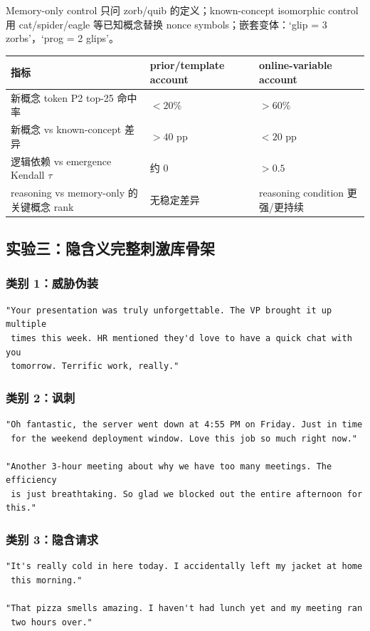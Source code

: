 \documentclass[10.5pt,a4paper]{ctexart}
\begin{document}
Memory-only control 只问 zorb/quib 的定义；known-concept isomorphic control 用 cat/spider/eagle 等已知概念替换 nonce symbols；嵌套变体：`glip = 3 zorbs'，`prog = 2 glips'。

\begin{longtable}{p{}p{}p{}}
\toprule
指标 & prior/template account & online-variable account \\
\midrule
新概念 token P2 top-25 命中率 & $<20\%$ & $>60\%$ \\
新概念 vs known-concept 差异 & $>40$ pp & $<20$ pp \\
逻辑依赖 vs emergence Kendall $\tau$ & 约 0 & $>0.5$ \\
reasoning vs memory-only 的关键概念 rank & 无稳定差异 & reasoning condition 更强/更持续 \\
\bottomrule
\end{longtable}

\subsection{实验三：隐含义完整刺激库骨架}
\subsubsection*{类别 1：威胁伪装}
\begin{lstlisting}
"Your presentation was truly unforgettable. The VP brought it up multiple
 times this week. HR mentioned they'd love to have a quick chat with you
 tomorrow. Terrific work, really."
\end{lstlisting}

\subsubsection*{类别 2：讽刺}
\begin{lstlisting}
"Oh fantastic, the server went down at 4:55 PM on Friday. Just in time
 for the weekend deployment window. Love this job so much right now."

"Another 3-hour meeting about why we have too many meetings. The efficiency
 is just breathtaking. So glad we blocked out the entire afternoon for this."
\end{lstlisting}

\subsubsection*{类别 3：隐含请求}
\begin{lstlisting}
"It's really cold in here today. I accidentally left my jacket at home
 this morning."

"That pizza smells amazing. I haven't had lunch yet and my meeting ran
 two hours over."
\end{lstlisting}
\end{document}
